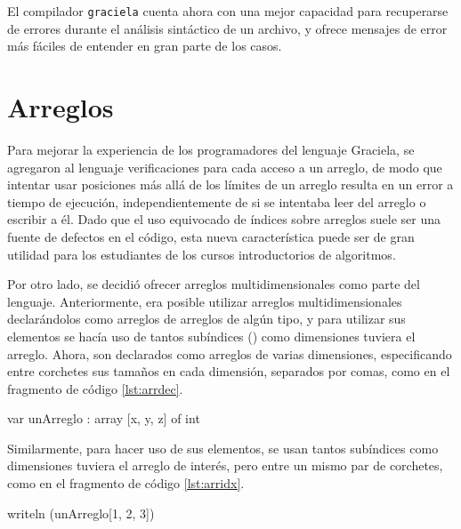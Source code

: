 El compilador \texttt{graciela} cuenta ahora con una mejor capacidad para
recuperarse de errores durante el análisis sintáctico de un archivo, y ofrece
mensajes de error más fáciles de entender en gran parte de los casos.

\section{Arreglos}

Para mejorar la experiencia de los programadores del lenguaje Graciela, se
agregaron al lenguaje verificaciones para cada acceso a un arreglo, de modo que
intentar usar posiciones más allá de los límites de un arreglo resulta en un
error a tiempo de ejecución, independientemente de si se intentaba leer del
arreglo o escribir a él. Dado que el uso equivocado de índices sobre arreglos
suele ser una fuente de defectos en el código, esta nueva característica puede
ser de gran utilidad para los estudiantes de los cursos introductorios de
algoritmos.

Por otro lado, se decidió ofrecer arreglos multidimensionales como parte del
lenguaje. Anteriormente, era posible utilizar arreglos multidimensionales
declarándolos como arreglos de arreglos de algún tipo, y para utilizar sus
elementos se hacía uso de tantos subíndices (\ingra{[i]}) como dimensiones
tuviera el arreglo. Ahora, son declarados como arreglos de varias dimensiones,
especificando entre corchetes sus tamaños en cada dimensión, separados por
comas, como en el fragmento de código \ref{lst:arrdec}.

\begin{gracielacode}[caption=Declaración de variable de tipo arreglo, label=lst:arrdec]
var unArreglo : array [x, y, z] of int
\end{gracielacode}

Similarmente, para hacer uso de sus elementos, se usan tantos subíndices como
dimensiones tuviera el arreglo de interés, pero entre un mismo par de corchetes,
como en el fragmento de código \ref{lst:arridx}.

\begin{gracielacode}[caption=Acceso a variable de tipo arreglo, label=lst:arridx]
writeln (unArreglo[1, 2, 3])
\end{gracielacode}

